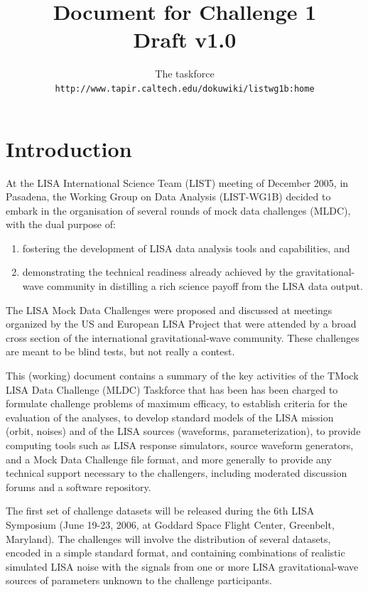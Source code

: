 \documentclass[11pt]{report}
\begin{document}
\title{\bf Document for Challenge 1\\
Draft v1.0}

\author{The taskforce\\
{\tt http://www.tapir.caltech.edu/dokuwiki/listwg1b:home}
}

\maketitle

\chapter{Introduction}

At the LISA International Science Team (LIST) meeting of December 2005, in Pasadena, the Working Group on Data Analysis (LIST-WG1B) decided to embark in the organisation of several rounds of mock data challenges (MLDC), with the dual purpose of:
\begin{enumerate}
\item fostering the development of LISA data analysis tools and capabilities, and 
\item demonstrating the technical readiness already achieved by the gravitational-wave community in distilling a rich science payoff from the LISA data output.
\end{enumerate}
 The LISA Mock Data Challenges were proposed and discussed at meetings organized by the US and European LISA Project that were attended by a broad cross section of the international gravitational-wave community. These challenges are meant to be blind tests, but not really a contest.

This (working) document contains a summary of the key activities of the TMock LISA Data Challenge (MLDC) Taskforce that has been has been charged to formulate challenge problems of maximum efficacy, to establish criteria for the evaluation of the analyses, to develop standard models of the LISA mission (orbit, noises) and of the LISA sources (waveforms, parameterization), to provide computing tools such as LISA response simulators, source waveform generators, and a Mock Data Challenge file format, and more generally to provide any technical support necessary to the challengers, including moderated discussion forums and a software repository. 

The first set of challenge datasets will be released during the 6th LISA Symposium (June 19-23, 2006, at Goddard Space Flight Center, Greenbelt, Maryland). The challenges will involve the distribution of several datasets, encoded in a simple standard format, and containing combinations of realistic simulated LISA noise with the signals from one or more LISA gravitational-wave sources of parameters unknown to the challenge participants.
\end{document}

